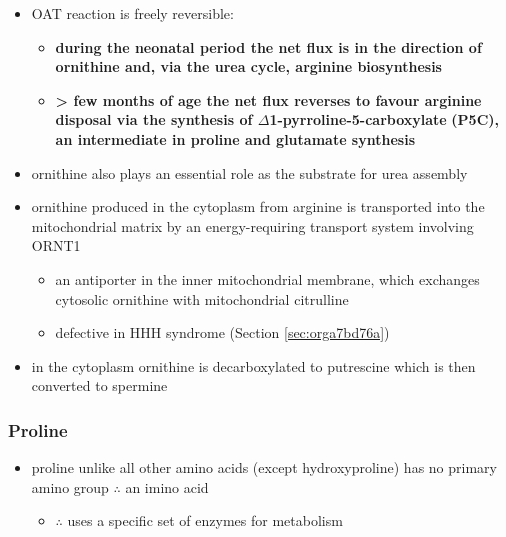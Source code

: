 \documentclass[12pt]{scrartcl}
\begin{document}
\begin{center}
\begin{center}
\begin{itemize}
\item OAT reaction is freely reversible:
\begin{itemize}
\item \textbf{during the neonatal period the net flux is in the direction of}
\textbf{ornithine and, via the urea cycle, arginine biosynthesis}
\item \textbf{\textgreater{} few months of age the net flux reverses to favour arginine}
\textbf{disposal via the synthesis of \(\Delta\)1-pyrroline-5-carboxylate}
\textbf{(P5C), an intermediate in proline and glutamate synthesis}
\end{itemize}
\item ornithine also plays an essential role as the substrate for urea assembly
\item ornithine produced in the cytoplasm from arginine is transported
into the mitochondrial matrix by an energy-requiring transport
system involving ORNT1
\begin{itemize}
\item an antiporter in the inner mitochondrial membrane, which exchanges
cytosolic ornithine with mitochondrial citrulline
\item defective in HHH syndrome (Section \ref{sec:orga7bd76a})
\end{itemize}
\item in the cytoplasm ornithine is decarboxylated to putrescine which is
then converted to spermine
\end{itemize}

\subsubsection{Proline}
\label{sec:org9ba8c4c}
\begin{itemize}
\item proline unlike all other amino acids (except hydroxyproline) has
no primary amino group \(\therefore\) an imino acid
\begin{itemize}
\item \(\therefore\) uses a specific set of enzymes for metabolism
\end{itemize}
\end{itemize}

\begin{center}
\chemnameinit{}
\end{center}


\end{center}
\end{center}
\end{document}
